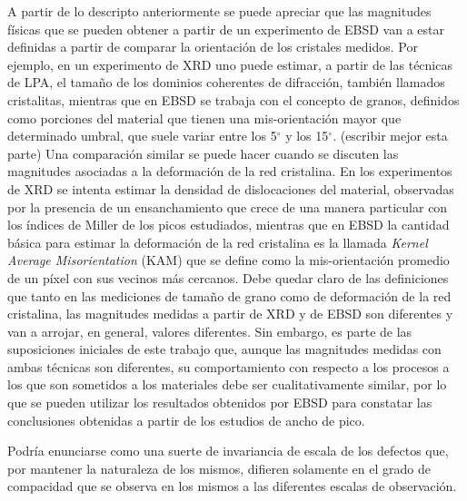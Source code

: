 A partir de lo descripto anteriormente se puede apreciar que las magnitudes físicas que se pueden obtener a partir de un experimento de EBSD van a estar definidas a partir de comparar la orientación de los cristales medidos.
Por ejemplo, en un experimento de XRD uno puede estimar, a partir de las técnicas de LPA, el tamaño de los dominios coherentes de difracción, también llamados cristalitas, mientras que en EBSD se trabaja con el concepto de granos, definidos como porciones del material que tienen una mis-orientación mayor que determinado umbral, que suele variar entre los 5$^{\circ}$ y los 15$^{\circ}$. (escribir mejor esta parte)
Una comparación similar se puede hacer cuando se discuten las magnitudes asociadas a la deformación de la red cristalina. En los experimentos de XRD se intenta estimar la densidad de dislocaciones del material, observadas por la presencia de un ensanchamiento que crece de una manera particular con los índices  de Miller de los picos estudiados, mientras que en EBSD la cantidad básica para estimar la deformación de la red cristalina es la llamada \textit{Kernel Average Misorientation} (KAM) que se define como la mis-orientación promedio de un píxel con sus vecinos más cercanos.
Debe quedar claro de las definiciones que tanto en las mediciones de tamaño de grano como de deformación de la red cristalina, las magnitudes medidas a partir de XRD y de EBSD son diferentes y van a arrojar, en general, valores diferentes.
Sin embargo, es parte de las suposiciones iniciales de este trabajo que, aunque las magnitudes medidas con ambas técnicas son diferentes, su comportamiento con respecto a los procesos a los que son sometidos a los materiales debe ser cualitativamente similar, por lo que se pueden utilizar los resultados obtenidos por EBSD para constatar las conclusiones obtenidas a partir de los estudios de ancho de pico.

Podría enunciarse como una suerte de invariancia de escala de los defectos que, por mantener la naturaleza de los mismos, difieren solamente en el grado de compacidad que se observa en los mismos a las diferentes escalas de observación.

